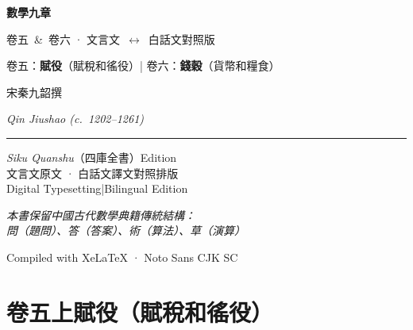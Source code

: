 \documentclass[11pt,a4paper]{article}
\begin{document}
\begin{titlepage}
\centering
\vspace*{2.5cm}

{\fontsize{36}{44}\selectfont\color{titlecolor}\CJKfamily{}\textbf{數學九章}}

\vspace{1.2cm}

{\fontsize{16}{20}\selectfont\color{sectioncolor} 卷五~\&~卷六 · 文言文~$\longleftrightarrow$~白話文對照版}

\vspace{0.8cm}

{\large\color{sectioncolor}
卷五：\textbf{賦役}（賦稅和徭役）\quad|\quad
卷六：\textbf{錢穀}（貨幣和糧食）}

\vspace{2.5cm}

{\large 宋\quad 秦九韶\quad 撰}

\vspace{0.5cm}

{\normalsize\textit{Qin Jiushao (c.\ 1202--1261)}}

\vspace{2cm}

{\color{rulecolor}\rule{0.6\textwidth}{0.4pt}}

\vspace{1.5cm}

{\small\color{sectioncolor}
\textit{Siku Quanshu}（四庫全書）Edition\\[0.5em]
文言文原文 · 白話文譯文對照排版\\[0.3em]
Digital Typesetting\quad|\quad Bilingual Edition}

\vspace{2.5cm}

{\small\color{notecolor}
\textit{本書保留中國古代數學典籍傳統結構：\\
問（題問）、答（答案）、術（算法）、草（演算）}}

\vfill
{\small\color{sectioncolor} Compiled with XeLaTeX · Noto Sans CJK SC}
\end{titlepage}

\tableofcontents
\newpage



\newpage
\section*{\color{titlecolor}卷五上\quad 賦役（賦稅和徭役）}
\end{document}
